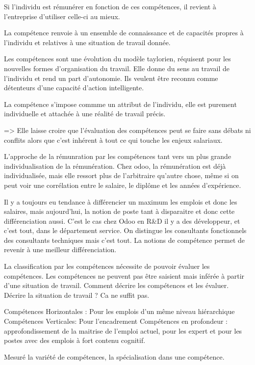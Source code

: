 Si l'individu est rémunérer en fonction de ces compétences, il revient à l'entreprise d'utiliser celle-ci au mieux. 

La compétence renvoie à un ensemble de connaissance et de capacités propres à l'individu et relatives à une situation de travail donnée. 

Les compétences sont une évolution du modèle taylorien, réquisent pour les nouvelles formes d'organisation du travail. Elle donne du sens au travail de l'individu et rend un part d'autonomie. Ils veulent être reconnu comme détenteurs d'une capacité d'action intelligente. 

La compétence s'impose commme un attribut de l'individu, elle est purement individuelle et attachée à une réalité de travail précis. 

=> Elle laisse croire que l'évaluation des compétences peut se faire sans débats ni conflits alors que c'est inhérent à tout ce qui touche les enjeux salariaux. 

L'approche de la rémunration par les compétences tant vers un plus grande individualisation de la rémunération.
Chez odoo, la rémunération est déjà individualisée, mais elle ressort plus de l'arbitraire qu'autre chose, même si on peut voir une corrélation entre le salaire, le diplôme et les années d'expérience. 

Il y a toujours eu tendance à différencier un maximum les emplois et donc les salaires, mais aujourd'hui, la notion de poste tant à disparaitre et donc cette différenciation aussi. C'est le cas chez Odoo en R\&D il y a des développeur, et c'est tout, dans le département service. On distingue les consultants fonctionnels des consultants techniques mais c'est tout. La notions de compétence permet de revenir à une meilleur différenciation. 

La classification par les compétences nécessite de pouvoir évaluer les compétences. Les compétences ne peuvent pas être saisient mais inférée à partir d'une situation de travail. Comment décrire les compétences et les évaluer. Décrire la situation de travail ? Ca ne suffit pas.


Compétences Horizontales : Pour les emplois d'un même niveau hiérarchique
Compétences Verticales: Pour l'encadrement
Compétences en profondeur : approfondissement de la maitrise de l'emploi actuel, pour les expert et pour les postes avec des emplois à fort contenu cognitif. 


Mesuré la variété de compétences, la spécialisation dans une compétence. 



